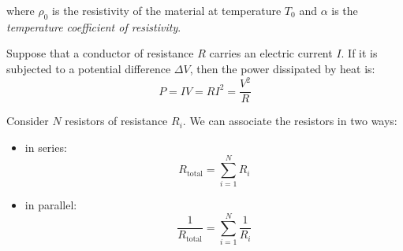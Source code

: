 \documentclass[../../../main.tex]{subfiles}
\begin{document}
\begin{multicols}{2}
\begin{definition}[Resistivity]
        where $\rho_0$ is the resistivity of the material at temperature $T_0$ and $\alpha$ is the \textit{temperature coefficient of resistivity}.
    \end{definition}
    \begin{prop}
        Suppose that a conductor of resistance $R$ carries an electric current $I$. If it is subjected to a potential difference $\Delta V$, then the power dissipated by heat is: $$P=IV=RI^2=\frac{V^2}{R}$$
    \end{prop}
    \begin{prop}
        Consider $N$ resistors of resistance $R_i$. We can associate the resistors in two ways:
        \begin{itemize}
            \item in series: $$R_\text{total}=\sum_{i=1}^NR_i$$
            \item in parallel: $$\frac{1}{R_\text{total}}=\sum_{i=1}^N\frac{1}{R_i}$$
        \end{itemize}
    \end{prop}

\end{multicols}
\end{document}
